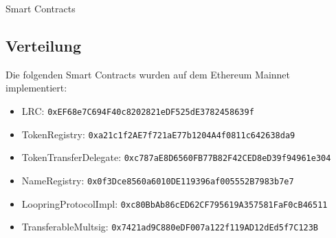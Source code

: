\documentclass[UTF8,nofonts]{article}
\makeatletter
\newenvironment{figurehere}
 {\def\@captype{figure}}
 {}
\makeatother
\begin{document}
\begin{appendices}
\begin{center}
\begin{figurehere}
\caption{Smart Contracts}
\label{fig:smartcontracts}
\end{figurehere}
\end{center}

\subsection{Verteilung}

Die folgenden Smart Contracts wurden auf dem Ethereum Mainnet implementiert:
\begin{itemize}
\item LRC: \verb|0xEF68e7C694F40c8202821eDF525dE3782458639f|
\item TokenRegistry: \verb|0xa21c1f2AE7f721aE77b1204A4f0811c642638da9|
\item TokenTransferDelegate: \verb|0xc787aE8D6560FB77B82F42CED8eD39f94961e304|
\item NameRegistry: \verb|0x0f3Dce8560a6010DE119396af005552B7983b7e7|
\item LoopringProtocolImpl: \verb|0xc80BbAb86cED62CF795619A357581FaF0cB46511|
\item TransferableMultsig: \verb|0x7421ad9C880eDF007a122f119AD12dEd5f7C123B|
\end{itemize}

\end{appendices}
\end{document}
